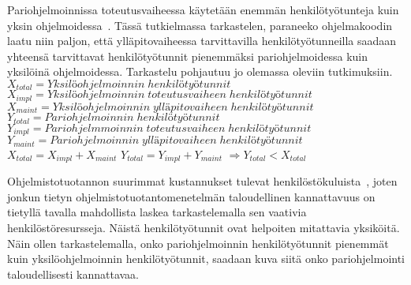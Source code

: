 \documentclass[finnish]{tktltiki2}
\theoremstyle{definition}
\theoremstyle{remark}
\begin{document}
Pariohjelmoinnissa toteutusvaiheessa käytetään enemmän henkilötyötunteja kuin yksin ohjelmoidessa~\cite{costandbenefit2}. Tässä tutkielmassa tarkastelen, paraneeko ohjelmakoodin laatu niin paljon, että ylläpitovaiheessa tarvittavilla henkilötyötunneilla saadaan yhteensä tarvittavat henkilötyötunnit pienemmäksi pariohjelmoidessa kuin yksilöinä ohjelmoidessa. Tarkastelu pohjautuu jo olemassa oleviin tutkimuksiin.\newline\newline
$X_{total} = Yksilöohjelmoinnin\; henkilötyötunnit $\newline
$X_{impl} = Yksilöohjelmoinnin\; toteutusvaiheen\; henkilötyötunnit $\newline
$X_{maint} = Yksilöohjelmoinnin\; ylläpitovaiheen\; henkilötyötunnit $\newline
$Y_{total} = Pariohjelmoinnin\; henkilötyötunnit $\newline
$Y_{impl} = Pariohjelmmoinnin\; toteutusvaiheen\; henkilötyötunnit $\newline
$Y_{maint} = Pariohjelmoinnin\; ylläpitovaiheen\; henkilötyötunnit $\newline
$X_{total} = X_{impl} + X_{maint} $\newline
$Y_{total} = Y_{impl} + Y_{maint} $\newline
$\Rightarrow Y_{total} < X_{total}$ \newline

Ohjelmistotuotannon suurimmat kustannukset tulevat henkilöstökuluista~\cite{haikala1995ohjelmistotuotanto}, joten jonkun tietyn ohjelmistotuotantomenetelmän taloudellinen kannattavuus on tietyllä tavalla mahdollista laskea tarkastelemalla sen vaativia henkilöstöresursseja. Näistä henkilötyötunnit ovat helpoiten mitattavia yksiköitä. Näin ollen tarkastelemalla, onko pariohjelmoinnin henkilötyötunnit pienemmät kuin yksilöohjelmoinnin henkilötyötunnit, saadaan kuva siitä onko pariohjelmointi taloudellisesti kannattavaa.


\end{document}
